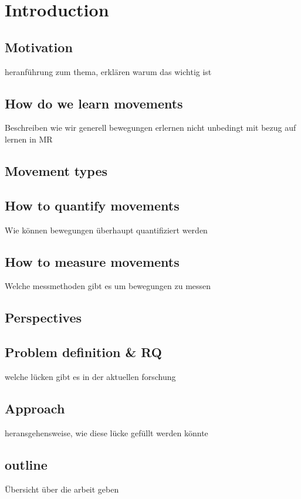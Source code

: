 \chapter{Introduction}

\section{Motivation}
heranführung zum thema, erklären warum das wichtig ist

\section{How do we learn movements}
Beschreiben wie wir generell bewegungen erlernen nicht unbedingt mit bezug auf lernen in MR

\section{Movement types}

\section{How to quantify movements}
Wie können bewegungen überhaupt quantifiziert werden

\section{How to measure movements}
Welche messmethoden gibt es um bewegungen zu messen

\section{Perspectives}


\section{Problem definition & RQ}
welche lücken gibt es in der aktuellen forschung

\section{Approach}
heransgehensweise, wie diese lücke gefüllt werden könnte

\section{outline}
Übersicht über die arbeit geben

